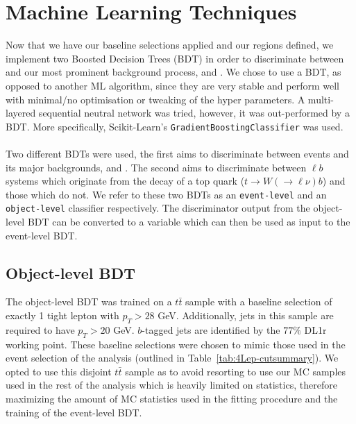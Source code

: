 \section{Machine Learning Techniques}
Now that we have our baseline selections applied and our regions defined, we implement two Boosted Decision Trees (BDT) in order to discriminate between \tWZ and our most prominent background process, \ttZ and \ZZ. We chose to use a BDT, as opposed to another ML algorithm, since they are very stable and perform well with minimal/no optimisation or tweaking of the hyper parameters. A multi-layered sequential neutral network was tried, however, it was out-performed by a BDT. More specifically, Scikit-Learn's \texttt{GradientBoostingClassifier} was used.\\\\
Two different BDTs were used, the first aims to discriminate between \tWZ events and its major backgrounds, \ttZ and \ZZ. The second aims to discriminate between $\ell b$ systems which originate from the decay of a top quark ($t\rightarrow W(\rightarrow \ell \nu) b$) and those which do not. We refer to these two BDTs as an \texttt{event-level} and an \texttt{object-level} classifier respectively. The discriminator output from the object-level BDT can be converted to a variable which can then be used as input to the event-level BDT.
\subsection{Object-level BDT}
\label{sec:object-level-bdt}
The object-level BDT was trained on a $t\bar{t}$ sample with a baseline selection of exactly 1 tight lepton with $p_{T} > 28$ GeV. Additionally, jets in this sample are required to have $p_{T} > 20$ GeV. $b$-tagged jets are identified by the $77\%$ DL1r working point. These baseline selections were chosen to mimic those used in the event selection of the analysis (outlined in Table~\ref{tab:4Lep-cutsummary}). We opted to use this disjoint $t\bar{t}$ sample as to avoid resorting to use our MC samples used in the rest of the analysis which is heavily limited on statistics, therefore maximizing the amount of MC statistics used in the fitting procedure and the training of the event-level BDT.\\\\

